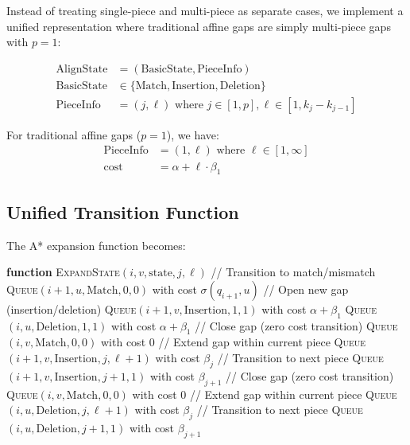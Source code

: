 \documentclass[11pt]{article}
\begin{document}
Instead of treating single-piece and multi-piece as separate cases, we implement a unified representation where traditional affine gaps are simply multi-piece gaps with $p = 1$:

\begin{align}
\text{AlignState} &= (\text{BasicState}, \text{PieceInfo}) \\
\text{BasicState} &\in \{\text{Match}, \text{Insertion}, \text{Deletion}\} \\
\text{PieceInfo} &= (j, \ell) \text{ where } j \in [1, p], \ell \in [1, k_j - k_{j-1}]
\end{align}

For traditional affine gaps ($p = 1$), we have:
\begin{align}
\text{PieceInfo} &= (1, \ell) \text{ where } \ell \in [1, \infty] \\
\text{cost} &= \alpha + \ell \cdot \beta_1
\end{align}

\subsection{Unified Transition Function}

The A* expansion function becomes:
\begin{algorithmic}
\STATE \textbf{function} \textsc{ExpandState}$(i, v, \text{state}, j, \ell)$
    \STATE // Transition to match/mismatch
        \STATE \textsc{Queue}$(i+1, u, \text{Match}, 0, 0)$ with cost $\sigma(q_{i+1}, u)$
    \ENDFOR
    \STATE // Open new gap (insertion/deletion)
    \STATE \textsc{Queue}$(i+1, v, \text{Insertion}, 1, 1)$ with cost $\alpha + \beta_1$
        \STATE \textsc{Queue}$(i, u, \text{Deletion}, 1, 1)$ with cost $\alpha + \beta_1$
    \ENDFOR
{}
    \STATE // Close gap (zero cost transition)
    \STATE \textsc{Queue}$(i, v, \text{Match}, 0, 0)$ with cost $0$
    \STATE // Extend gap within current piece
        \STATE \textsc{Queue}$(i+1, v, \text{Insertion}, j, \ell+1)$ with cost $\beta_j$
        \STATE // Transition to next piece
        \STATE \textsc{Queue}$(i+1, v, \text{Insertion}, j+1, 1)$ with cost $\beta_{j+1}$
    \ENDIF
{}
    \STATE // Close gap (zero cost transition)
    \STATE \textsc{Queue}$(i, v, \text{Match}, 0, 0)$ with cost $0$
    \STATE // Extend gap within current piece
            \STATE \textsc{Queue}$(i, u, \text{Deletion}, j, \ell+1)$ with cost $\beta_j$
            \STATE // Transition to next piece
            \STATE \textsc{Queue}$(i, u, \text{Deletion}, j+1, 1)$ with cost $\beta_{j+1}$
        \ENDIF
    \ENDFOR
\ENDIF
\end{algorithmic}
\end{document}
